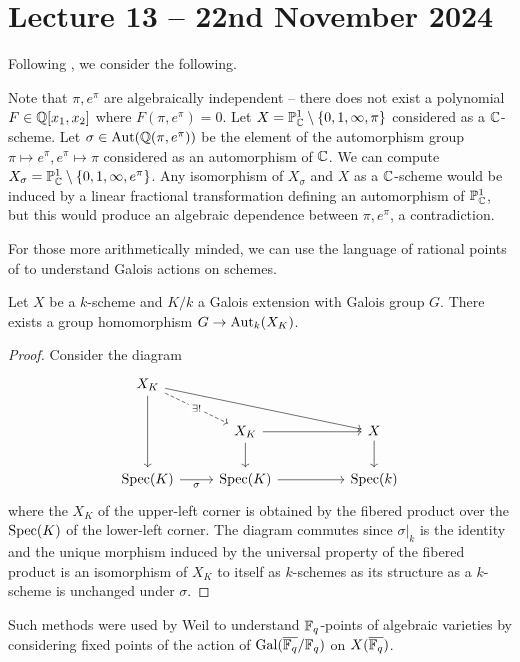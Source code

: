 \section{Lecture 13 -- 22nd November 2024}\label{sec: lecture 13}
Following , we consider the following. 
\begin{example}
    Note that $\pi,e^{\pi}$ are algebraically independent -- there does not exist a polynomial $F\in\mathbb{Q}[x_{1},x_{2}]$ where $F(\pi,e^{\pi})=0$. Let $X=\mathbb{P}^{1}_{\mathbb{C}}\setminus\{0,1,\infty,\pi\}$ considered as a $\mathbb{C}$-scheme. Let $\sigma\in\mathrm{Aut}(\mathbb{Q}(\pi,e^{\pi}))$ be the element of the automorphism group $\pi\mapsto e^{\pi},e^{\pi}\mapsto\pi$ considered as an automorphism of $\mathbb{C}$. We can compute $X_{\sigma}=\mathbb{P}^{1}_{\mathbb{C}}\setminus\{0,1,\infty,e^{\pi}\}$. Any isomorphism of $X_{\sigma}$ and $X$ as a $\mathbb{C}$-scheme would be induced by a linear fractional transformation defining an automorphism of $\mathbb{P}^{1}_{\mathbb{C}}$, but this would produce an algebraic dependence between $\pi,e^{\pi}$, a contradiction. 
\end{example}
For those more arithmetically minded, we can use the language of rational points of  to understand Galois actions on schemes. 
\begin{proposition}\label{prop: map from Galois group to automorphisms of scheme}
    Let $X$ be a $k$-scheme and $K/k$ a Galois extension with Galois group $G$. There exists a group homomorphism $G\to\mathrm{Aut}_{k}(X_{K})$. 
\end{proposition}
\begin{proof}
    Consider the diagram 
    $$%
    \begin{tikzcd}
        {X_{K}} \\
        & {X_{K}} && X \\
        {\spec(K)} & {\spec(K)} && {\spec(k)}
        \arrow["{\exists!}"{description}, dashed, from=1-1, to=2-2]
        \arrow[from=1-1, to=2-4]
        \arrow[from=1-1, to=3-1]
        \arrow[from=2-2, to=2-4]
        \arrow[from=2-2, to=3-2]
        \arrow[from=2-4, to=3-4]
        \arrow["\sigma"', from=3-1, to=3-2]
        \arrow[from=3-2, to=3-4]
    \end{tikzcd}$$
    where the $X_{K}$ of the upper-left corner is obtained by the fibered product over the $\operatorname{Spec}(K)$ of the lower-left corner. The diagram commutes since $\sigma|_{k}$ is the identity and the unique morphism induced by the universal property of the fibered product is an isomorphism of $X_{K}$ to itself as $k$-schemes as its structure as a $k$-scheme is unchanged under $\sigma$. 
\end{proof}
Such methods were used by Weil to understand $\mathbb{F}_{q}$-points of algebraic varieties by considering fixed points of the action of $\mathrm{Gal}(\overline{\mathbb{F}_{q}}/\mathbb{F}_{q})$ on $X(\overline{\mathbb{F}_{q}})$. 

